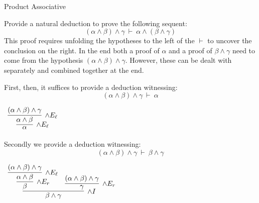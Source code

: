 \documentclass{book}
\begin{document}
        \begin{eg}{Product Associative}
    
            Provide a natural deduction to prove the following sequent: $$(\alpha \land \beta) \land \gamma \ \vdash \ \alpha \land (\beta \land \gamma) $$
            This proof requires unfolding the hypotheses to the left of the $\vdash$ to uncover the conclusion on the right. In the end both a proof of $\alpha$ and a proof of $\beta \land \gamma$ need to come from the hypothesis $(\alpha \land \beta) \land \gamma$. However, these can be dealt with separately and combined together at the end. 
    
            First, then, it suffices to provide a deduction witnessing: $$(\alpha \land \beta) \land \gamma \ \vdash \ \alpha$$
    
            \begin{center}
                $\begin{array}{c}
                    \infer[\land E_{\ell}]{\alpha}
                        {\infer[\land E_{\ell}]{\alpha \land \beta}
                            {(\alpha \land \beta) \land \gamma}}
                \end{array}$
            \end{center}
    
            Secondly we provide a deduction witnessing: $$(\alpha \land \beta) \land \gamma \ \vdash \ \beta \land \gamma$$
    
            \begin{center}
                $\begin{array}{c}
                    \infer[\land I]{\beta \land \gamma}
                        {\infer[\land E_{r}]{\beta} 
                            {\infer[\land E_{\ell}]{\alpha \land \beta}
                                {(\alpha \land \beta) \land \gamma}}
                        &
                        \infer[\land E_{r}]{\gamma} 
                            {(\alpha \land \beta) \land \gamma}}
                \end{array}$
            \end{center}
    

\end{eg}
\end{document}
